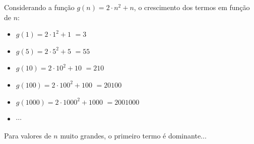 \newcommand{\custo}[1]{$g(#1) = 2{\cdot}#1^2 + #1$}%
\begin{frame}[label=main]
	Considerando a função \custo{n}, o crescimento dos termos em função de $n$:
	\begin{itemize}
		\item \custo{1}   	$ = 3$\pause
		\item \custo{5}   	$ = 55$\pause
		\item \custo{10}  	$ = 210$
		\item \custo{100} 	$ = 20100$
		\item \custo{1000}	$ = 2001000$
		\item $\cdots$
	\end{itemize}
	\vfill\pause
	Para valores de $n$ muito grandes, o \alert{primeiro} termo é \alert{dominante}...
\end{frame}